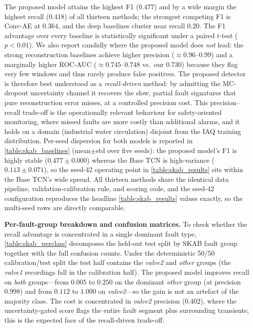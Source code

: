 

The proposed model attains the highest F1 ($0.477$) and by a wide margin the highest recall ($0.418$) of all thirteen methods; the strongest competing F1 is Conv-AE at $0.364$, and the deep baselines cluster near recall $0.20$. The F1 advantage over every baseline is statistically significant under a paired $t$-test ($p<0.01$). We also report candidly where the proposed model does \emph{not} lead: the strong reconstruction baselines achieve higher precision ($\approx 0.96$--$0.99$) and a marginally higher ROC-AUC ($\approx 0.745$--$0.748$ vs.\ our $0.730$) because they flag very few windows and thus rarely produce false positives. The proposed detector is therefore best understood as a \emph{recall-driven} method: by admitting the MC-dropout uncertainty channel it recovers the slow, partial fault signatures that pure reconstruction error misses, at a controlled precision cost. This precision--recall trade-off is the operationally relevant behaviour for safety-oriented monitoring, where missed faults are more costly than additional alarms, and it holds on a domain (industrial water circulation) disjoint from the IAQ training distribution. Per-seed dispersion for both models is reported in \cref{table:skab_baselines} (mean$\pm$std over five seeds): the proposed model's F1 is highly stable ($0.477\pm0.000$) whereas the Base TCN is high-variance ($0.113\pm0.071$), so the seed-42 operating point in \cref{table:skab_results} sits within the Base TCN's wide spread. All thirteen methods share the identical data pipeline, validation-calibration rule, and scoring code, and the seed-42 configuration reproduces the headline \cref{table:skab_results} values exactly, so the multi-seed rows are directly comparable.

\textbf{Per-fault-group breakdown and confusion matrices.} To check whether the recall advantage is concentrated in a single dominant fault type, \cref{table:skab_perclass} decomposes the held-out test split by SKAB fault group together with the full confusion counts. Under the deterministic 50/50 calibration/test split the test half contains the \emph{valve2} and \emph{other} groups (the \emph{valve1} recordings fall in the calibration half). The proposed model improves recall on \emph{both} groups---from $0.005$ to $0.250$ on the dominant \emph{other} group (at precision $0.998$) and from $0.112$ to $1.000$ on \emph{valve2}---so the gain is not an artefact of the majority class. The cost is concentrated in \emph{valve2} precision ($0.402$), where the uncertainty-gated score flags the entire fault segment plus surrounding transients; this is the expected face of the recall-driven trade-off.

